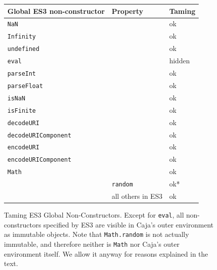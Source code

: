 \documentclass[letterpaper,twocolumn,10pt]{article}
\newcommand{\code}[1]{{\tt {#1}}}              %
\begin{document}
\begin{figure}
\begin{tabular}{lll}
  Global ES3 non-constructor & Property                   & Taming \\
  \hline
  \code{NaN}                &                             & ok \\
  \code{Infinity}           &                             & ok \\
  \code{undefined}          &                             & ok \\
  \code{eval}               &                             & hidden \\
  \code{parseInt}           &                             & ok \\
  \code{parseFloat}         &                             & ok \\
  \code{isNaN}              &                             & ok \\
  \code{isFinite}           &                             & ok \\
  \hline
  \code{decodeURI}          &                             & ok \\
  \code{decodeURIComponent} &                             & ok \\
  \code{encodeURI}          &                             & ok \\
  \code{encodeURIComponent} &                             & ok \\
  \hline
  \code{Math}               &                             & ok \\  
                            & \code{random}               & ok* \\
                            &           all others in ES3 & ok \\
\end{tabular}

\caption[Taming ES3 Global Non-Constructors.]{Taming ES3 Global 
Non-Constructors. Except for \code{eval}, all non-constructors specified by 
ES3 are visible in Caja's outer environment as immutable objects. Note that 
\code{Math.random} is not actually immutable, and therefore neither is 
\code{Math} nor Caja's outer environment itself. We allow it anyway for 
reasons explained in the text.}
\label{tab:taming-es3}
\end{figure}
\end{document}
